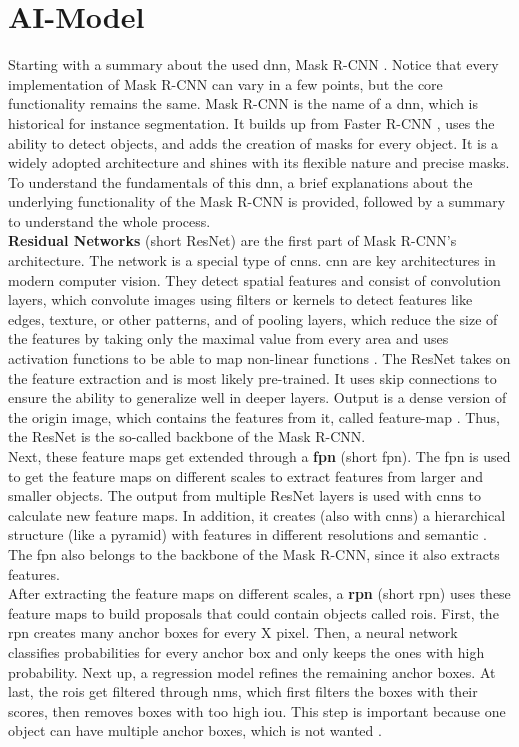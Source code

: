 	\section{AI-Model}
	\label{sec:ai-model}
		Starting with a summary about the used \ac{dnn}, Mask R-CNN \cite{Kaiming2017}. Notice that every implementation of Mask R-CNN can vary in a few points, but the core functionality remains the same.
		Mask R-CNN is the name of a \ac{dnn}, which is historical for instance segmentation. It builds up from Faster R-CNN \cite{Ren2016}, uses the ability to detect objects, and adds the creation of masks for every object. It is a widely adopted architecture and shines with its flexible nature and precise masks.\\
		To understand the fundamentals of this \ac{dnn}, a brief explanations about the underlying functionality of the Mask R-CNN is provided, followed by a summary to understand the whole process.\\
		\textbf{Residual Networks} (short ResNet) are the first part of Mask R-CNN's architecture. The network is a special type of \ac{cnn}s. \ac{cnn} are key architectures in modern computer vision. They detect spatial features and consist of convolution layers, which convolute images using filters or kernels to detect features like edges, texture, or other patterns, and of pooling layers, which reduce the size of the features by taking only the maximal value from every area and uses activation functions to be able to map non-linear functions \cite{Oshea2015}. The ResNet takes on the feature extraction and is most likely pre-trained. It uses skip connections to ensure the ability to generalize well in deeper layers. Output is a dense version of the origin image, which contains the features from it, called feature-map \cite{He2015}. Thus, the ResNet is the so-called backbone of the Mask R-CNN.\\
		Next, these feature maps get extended through a \textbf{\acl{fpn}} (short \ac{fpn}). The \ac{fpn} is used to get the feature maps on different scales to extract features from larger and smaller objects. The output from multiple ResNet layers is used with \ac{cnn}s to calculate new feature maps. In addition, it creates (also with \ac{cnn}s) a hierarchical structure (like a pyramid) with features in different resolutions and semantic \cite{Lin2017}. The \ac{fpn} also belongs to the backbone of the Mask R-CNN, since it also extracts features.\\
		After extracting the feature maps on different scales, a \textbf{\acl{rpn}} (short \ac{rpn}) uses these feature maps to build proposals that could contain objects called \ac{roi}s. First, the \ac{rpn} creates many anchor boxes for every X pixel. Then, a neural network classifies probabilities for every anchor box and only keeps the ones with high probability. Next up, a regression model refines the remaining anchor boxes. At last, the \ac{roi}s get filtered through \ac{nms}, which first filters the boxes with their scores, then removes boxes with too high \ac{iou}. This step is important because one object can have multiple anchor boxes, which is not wanted \cite{Ren2016}.\\
